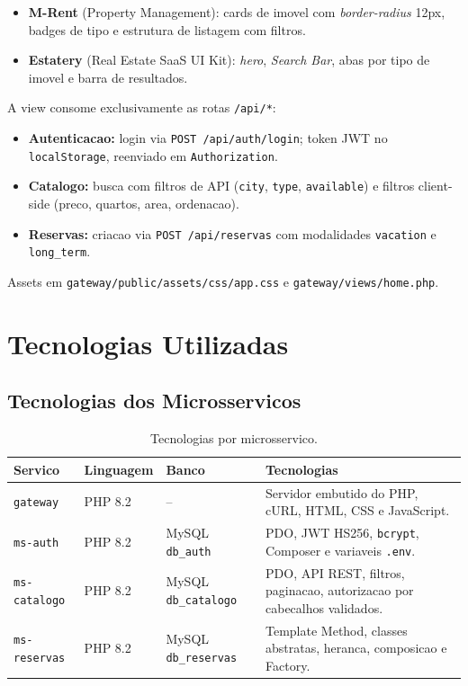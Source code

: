 \documentclass[12pt,a4paper]{article}
\begin{document}
\begin{itemize}
    \item \textbf{M-Rent} (Property Management): cards de imovel com \textit{border-radius}
    12px, badges de tipo e estrutura de listagem com filtros.
    \item \textbf{Estatery} (Real Estate SaaS UI Kit): \textit{hero}, \textit{Search Bar},
    abas por tipo de imovel e barra de resultados.
\end{itemize}

A view consome exclusivamente as rotas \texttt{/api/*}:

\begin{itemize}
    \item \textbf{Autenticacao:} login via \texttt{POST /api/auth/login}; token JWT no
    \texttt{localStorage}, reenviado em \texttt{Authorization}.
    \item \textbf{Catalogo:} busca com filtros de API (\texttt{city}, \texttt{type},
    \texttt{available}) e filtros client-side (preco, quartos, area, ordenacao).
    \item \textbf{Reservas:} criacao via \texttt{POST /api/reservas} com modalidades
    \texttt{vacation} e \texttt{long\_term}.
\end{itemize}

Assets em \texttt{gateway/public/assets/css/app.css} e \texttt{gateway/views/home.php}.

\section{Tecnologias Utilizadas}
\subsection{Tecnologias dos Microsservicos}
\begin{table}[htbp]
    \centering
    \small
    \begin{tabularx}{\textwidth}{p{2.8cm} p{2.1cm} p{3.1cm} Y}
    \toprule
    \textbf{Servico} & \textbf{Linguagem} & \textbf{Banco} & \textbf{Tecnologias} \\
    \midrule
    \texttt{gateway} & PHP 8.2 & -- & Servidor embutido do PHP, cURL, HTML, CSS e JavaScript. \\
    \texttt{ms-auth} & PHP 8.2 & MySQL \texttt{db\_auth} & PDO, JWT HS256, \texttt{bcrypt}, Composer e variaveis \texttt{.env}. \\
    \texttt{ms-catalogo} & PHP 8.2 & MySQL \texttt{db\_catalogo} & PDO, API REST, filtros, paginacao, autorizacao por cabecalhos validados. \\
    \texttt{ms-reservas} & PHP 8.2 & MySQL \texttt{db\_reservas} & Template Method, classes abstratas, heranca, composicao e Factory. \\
    \bottomrule
    \end{tabularx}
    \caption{Tecnologias por microsservico.}
    \label{tab:tecnologias_microservicos}
\end{table}
\end{document}
